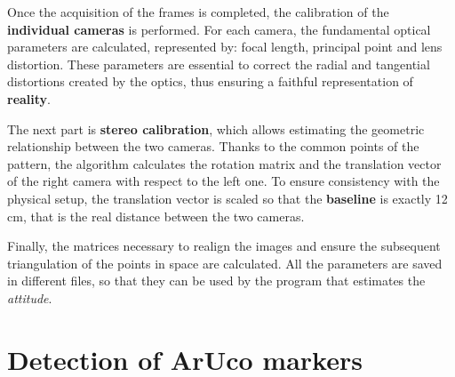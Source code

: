 Once the acquisition of the frames is completed, the calibration of the \textbf{individual cameras} is performed. For each camera, the fundamental optical parameters are calculated, represented by: focal length, principal point and lens distortion. These parameters are essential to correct the radial and tangential distortions created by the optics, thus ensuring a faithful representation of \textbf{reality}.

The next part is \textbf{stereo calibration}, which allows estimating the geometric relationship between the two cameras. Thanks to the common points of the pattern, the algorithm calculates the rotation matrix and the translation vector of the right camera with respect to the left one. To ensure consistency with the physical setup, the translation vector is scaled so that the \textbf{baseline} is exactly 12 cm, that is the real distance between the two cameras.

Finally, the matrices necessary to realign the images and ensure the subsequent triangulation of the points in space are calculated. All the parameters are saved in different files, so that they can be used by the program that estimates the \textit{attitude}.

\section{Detection of ArUco markers}

